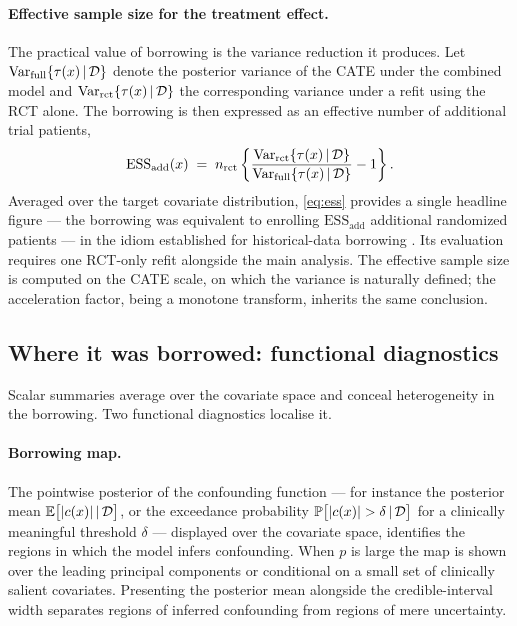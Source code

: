 \paragraph{Effective sample size for the treatment effect.}
The practical value of borrowing is the variance reduction it produces. Let
$\mathrm{Var}_{\text{full}}\{\tau(x) \,\vert\, \mathcal{D}\}$ denote the posterior variance of
the CATE under the combined model and $\mathrm{Var}_{\text{rct}}\{\tau(x) \,\vert\, \mathcal{D}\}$
the corresponding variance under a refit using the RCT alone. The borrowing is
then expressed as an effective number of additional trial patients,
\begin{equation}
\label{eq:ess}
\mathrm{ESS}_{\text{add}}(x)
  \;=\; n_{\text{rct}}
  \left\{
  \frac{\mathrm{Var}_{\text{rct}}\{\tau(x) \,\vert\, \mathcal{D}\}}
       {\mathrm{Var}_{\text{full}}\{\tau(x) \,\vert\, \mathcal{D}\}} - 1
  \right\}.
\end{equation}
Averaged over the target covariate distribution, \eqref{eq:ess} provides a
single headline figure --- the borrowing was equivalent to enrolling
$\mathrm{ESS}_{\text{add}}$ additional randomized patients --- in the idiom
established for historical-data borrowing
\citep{neuenschwander2010,hupf2021}. Its evaluation requires one RCT-only refit
alongside the main analysis. The effective sample size is computed on the CATE
scale, on which the variance is naturally defined; the acceleration factor,
being a monotone transform, inherits the same conclusion.

\subsection{Where it was borrowed: functional diagnostics}

Scalar summaries average over the covariate space and conceal heterogeneity in
the borrowing. Two functional diagnostics localise it.

\paragraph{Borrowing map.}
The pointwise posterior of the confounding function --- for instance the
posterior mean $\mathbb{E}\bigl[|c(x)| \,\vert\, \mathcal{D}\bigr]$, or the exceedance
probability $\mathbb{P}\bigl[|c(x)| > \delta \,\vert\, \mathcal{D}\bigr]$ for a clinically
meaningful threshold $\delta$ --- displayed over the covariate space, identifies
the regions in which the model infers confounding. When $p$ is large the map is
shown over the leading principal components or conditional on a small set of
clinically salient covariates. Presenting the posterior mean alongside the
credible-interval width separates regions of inferred confounding from regions
of mere uncertainty.

